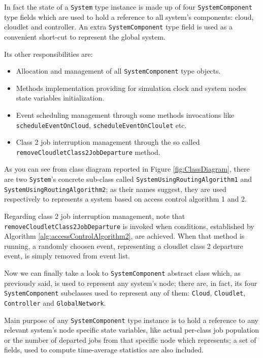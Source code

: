 \documentclass[10pt,a4paper]{article}
\begin{document}
In fact the state of a \texttt{System} type instance is made up of four \texttt{SystemComponent} type fields which are used to hold a reference to all system's components: cloud, cloudlet and controller. An extra \texttt{SystemComponent} type field is used as a convenient short-cut to represent the global system.

Its other responsibilities are:

\begin{itemize}

\item Allocation and management of all \texttt{SystemComponent} type objects.

\item Methods implementation providing for simulation clock and system nodes state variables initialization.

\item Event scheduling management through some methods invocations like \texttt{sche\-dule\-Event\-OnCloud}, \texttt{scheduleEventOnCloulet} etc.

\item Class 2 job interruption management through the so called \texttt{removeCloud\-let\-Class2JobDeparture} method.
\end{itemize}

As you can see from class diagram reported in Figure \ref{fig:ClassDiagram}, there are two \texttt{System}'s concrete sub-class called \texttt{Sys\-tem\-Using\-RoutingAlgorithm1} and \texttt{System\-UsingRoutingAlgorithm2}; as their names suggest, they are used respectively to represents a system based on access control algorithm 1 and 2. 

Regarding class 2 job interruption management, note that \texttt{removeCloud\-let\-Class2JobDeparture} is invoked when conditions, established by Algorithm \ref{alg:accessControlAlgorithm2}, are achieved. When that method is running, a randomly choosen event, representing a cloudlet class 2 departure event, is simply removed from event list.

Now we can finally take a look to \texttt{SystemComponent} abstract class which, as previously said, is used to represent any system's node; there are, in fact, its four \texttt{SystemComponent} subclasses used to represent any of them: \texttt{Cloud}, \texttt{Cloudlet}, \texttt{Controller} and \texttt{GlobalNetwork}. 

Main purpose of any \texttt{SystemComponent} type instance is to hold a reference to any relevant system's node specific state variables, like actual per-class job population or the number of departed jobs from that specific node which represents; a set of fields, used to compute time-average statistics are also included.
\end{document}
